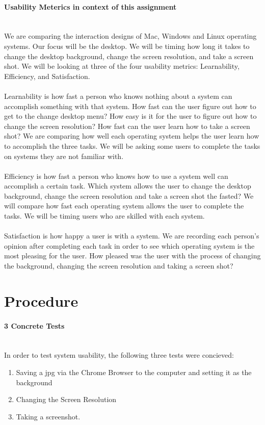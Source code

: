\documentclass[12pt, onesided, letterpaper]{report}
\begin{document}
\paragraph*{Usability Meterics in context of this assignment}~\\
We are comparing the interaction designs of Mac, Windows and Linux operating systems.  Our focus will be the desktop.  We will be timing how long it takes to change the desktop background, change the screen resolution, and take a screen shot.  We will be looking at three of the four usability metrics: Learnability, Efficiency, and Satisfaction.  \\
~\\
Learnability is how fast a person who knows nothing about a system can accomplish something with that system.  How fast can the user figure out how to get to the change desktop menu?  How easy is it for the user to figure out how to change the screen resolution?  How fast can the user learn how to take a screen shot?  We are comparing how well each operating system helps the user learn how to accomplish the three tasks.  We will be asking some users to complete the tasks on systems they are not familiar with.\\

~\\
Efficiency is how fast a person who knows how to use a system well can accomplish a certain task.  Which system allows the user to change the desktop background, change the screen resolution and take a screen shot the fasted?  We will compare how fast each operating system allows the user to complete the tasks.  We will be timing users who are skilled with each system.\\
~\\
Satisfaction is how happy a user is with a system.  We are recording each person’s opinion after completing each task in order to see which operating system is the most pleasing for the user.  How pleased was the user with the process of changing the background, changing the screen resolution and taking a screen shot?\\

\pagebreak

\section*{Procedure}

\paragraph*{3 Concrete Tests} ~\\
In order to test system usability, the following three tests were concieved:
\begin{enumerate}
\item Saving a jpg via the Chrome Browser to the computer and setting it as the background
\item Changing the Screen Resolution
\item Taking a screenshot.
\end{enumerate}
\end{document}
